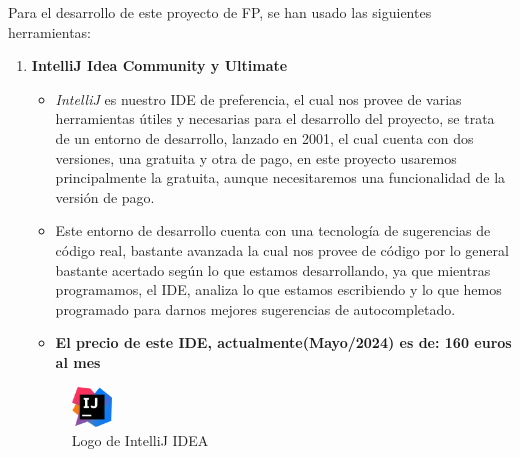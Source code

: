 \documentclass[a4paper]{article}
\begin{document}
Para el desarrollo de este proyecto de FP, se han usado las siguientes herramientas:
\begin{enumerate}
    \item \textbf{IntelliJ Idea Community y Ultimate}
          \begin{itemize}
              \item \textit{IntelliJ} es nuestro IDE de preferencia, el cual nos provee de varias herramientas útiles y necesarias para el desarrollo del proyecto, se trata de un entorno de desarrollo, lanzado en 2001, el cual cuenta con dos versiones, una gratuita y otra de pago, en este proyecto usaremos principalmente la gratuita, aunque necesitaremos una funcionalidad de la versión de pago.
              \item Este entorno de desarrollo cuenta con una tecnología de sugerencias de código real, bastante avanzada la cual nos provee de código por lo general bastante acertado según lo que estamos desarrollando, ya que mientras programamos, el IDE, analiza lo que estamos escribiendo y lo que hemos programado para darnos mejores sugerencias de autocompletado.
              \item \textbf{El precio de este IDE, actualmente(Mayo/2024) es de: 160 euros al mes}
          \end{itemize}
          \begin{figure}[!ht]
              \centering
              \includegraphics[width=0.1\textwidth]{Images/IntelliJ_IDEA_Icon.svg.png}
              \caption{Logo de IntelliJ IDEA}
              \label{fig:intellij}
          \end{figure}


\end{enumerate}
\end{document}
